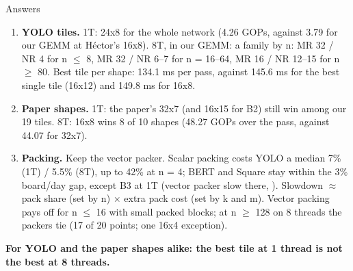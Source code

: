 \begin{frame}{Answers}
\small
\begin{enumerate}\setlength\itemsep{6pt}
\item \textbf{YOLO tiles.} 1T: 24x8 for the whole network (4.26 GOPs, against 3.79 for our GEMM at H\'ector's 16x8). 8T, in our GEMM: a family by n: MR 32 / NR 4 for n $\le$ 8, MR 32 / NR 6--7 for n = 16--64, MR 16 / NR 12--15 for n $\ge$ 80. Best tile per shape: 134.1 ms per pass, against 145.6 ms for the best single tile (16x12) and 149.8 ms for 16x8.
\item \textbf{Paper shapes.} 1T: the paper's 32x7 (and 16x15 for B2) still win among our 19 tiles. 8T: 16x8 wins 8 of 10 shapes (48.27 GOPs over the pass, against 44.07 for 32x7).
\item \textbf{Packing.} Keep the vector packer. Scalar packing costs YOLO a median 7\% (1T) / 5.5\% (8T), up to 42\% at n = 4; BERT and Square stay within the 3\% board/day gap, except B3 at 1T (vector packer slow there, ). Slowdown $\approx$ pack share (set by n) $\times$ extra pack cost (set by k and m). Vector packing pays off for n $\le$ 16 with small packed blocks; at n $\ge$ 128 on 8 threads the packers tie (17 of 20 points; one 16x4 exception).
\end{enumerate}
\vspace{4pt}
\textbf{For YOLO and the paper shapes alike: the best tile at 1 thread is not the best at 8 threads.}
\end{frame}

